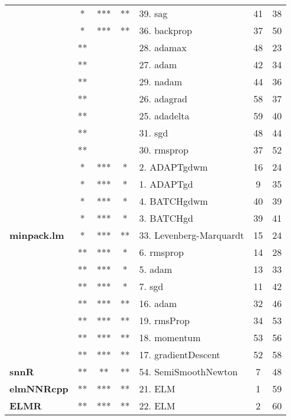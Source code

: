 \begin{Schunk}
\begin{table}
\begin{tabular}[t]{>{\bfseries}lccclcc}
 & * & *** & ** & 39. sag & 41 & 38\\

\multirow{-5}{*}{\raggedright\arraybackslash neuralnet} & * & *** & ** & 36. backprop & 37 & 50\\
\cmidrule{1-7}
 & ** &  &  & 28. adamax & 48 & 23\\

 & ** &  &  & 27. adam & 42 & 34\\

 & ** &  &  & 29. nadam & 44 & 36\\

 & ** &  &  & 26. adagrad & 58 & 37\\

 & ** &  &  & 25. adadelta & 59 & 40\\

 & ** &  &  & 31. sgd & 48 & 44\\

\multirow{-7}{*}{\raggedright\arraybackslash keras} & ** &  &  & 30. rmsprop & 37 & 52\\
\cmidrule{1-7}
 & * & *** & * & 2. ADAPTgdwm & 16 & 24\\

 & * & *** & * & 1. ADAPTgd & 9 & 35\\

 & * & *** & * & 4. BATCHgdwm & 40 & 39\\

\multirow{-4}{*}{\raggedright\arraybackslash AMORE} & * & *** & * & 3. BATCHgd & 39 & 41\\
\cmidrule{1-7}
minpack.lm & * & *** & ** & 33. Levenberg-Marquardt & 15 & 24\\
\cmidrule{1-7}
 & ** & *** & * & 6. rmsprop & 14 & 28\\

 & ** & *** & * & 5. adam & 13 & 33\\

\multirow{-3}{*}{\raggedright\arraybackslash ANN2} & ** & *** & * & 7. sgd & 11 & 42\\
\cmidrule{1-7}
 & ** & *** & ** & 16. adam & 32 & 46\\

 & ** & *** & ** & 19. rmsProp & 34 & 53\\

 & ** & *** & ** & 18. momentum & 53 & 56\\

\multirow{-4}{*}{\raggedright\arraybackslash deepdive} & ** & *** & ** & 17. gradientDescent & 52 & 58\\
\cmidrule{1-7}
snnR & ** & ** & ** & 54. SemiSmoothNewton & 7 & 48\\
\cmidrule{1-7}
elmNNRcpp & ** & *** & ** & 21. ELM & 1 & 59\\
\cmidrule{1-7}
ELMR & ** & *** & ** & 22. ELM & 2 & 60\\
\bottomrule
\end{tabular}
\end{table}

\end{Schunk}

